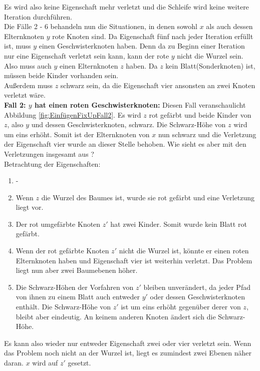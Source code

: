 \documentclass[a4paper,12pt]{article}
\begin{document}
\noindent Es wird also keine Eigenschaft mehr verletzt und die Schleife wird keine weitere Iteration durchführen.\\
Die Fälle 2 - 6 behandeln nun die Situationen, in denen sowohl $x$ als auch dessen Elternknoten $y$ rote Knoten sind. Da Eigenschaft fünf nach jeder Iteration erfüllt ist, muss $y$ einen Geschwisterknoten haben. Denn da zu Beginn einer Iteration nur eine Eigenschaft verletzt sein kann, kann der rote $y$ nicht die Wurzel sein. Also muss auch $y$ einen Elternknoten $z$ haben. Da $z$ kein Blatt(Sonderknoten) ist, müssen beide Kinder vorhanden sein.\\
Außerdem muss $z$ schwarz sein, da die Eigenschaft vier ansonsten an zwei Knoten verletzt wäre.\\

\noindent\textbf{Fall 2: $y$ hat einen roten Geschwisterknoten: } \label{if2}
\noindent Diesen Fall veranschaulicht Abbildung \ref{fig:EinfügenFixUpFall2}. Es wird $z$ rot gefärbt und beide Kinder von $z$, also $y$ und dessen Geschwisterknoten, schwarz. Die Schwarz-Höhe von $z$ wird um eins erhöht. Somit ist der Elternknoten von $x$ nun schwarz und die Verletzung der Eigenschaft vier wurde an dieser Stelle behoben. Wie sieht es aber mit den Verletzungen insgesamt aus ? \\

Betrachtung der Eigenschaften:

\begin{enumerate}
	\item -
	\item Wenn $z$ die Wurzel des Baumes ist, wurde sie rot gefärbt und eine Verletzung liegt vor.
	\item Der rot umgefärbte Knoten $z'$ hat zwei Kinder. Somit wurde kein Blatt rot gefärbt.
	\item  Wenn der rot gefärbte Knoten $z'$ nicht die Wurzel ist, könnte er einen roten Elternknoten haben und Eigenschaft vier ist weiterhin verletzt. Das Problem liegt nun aber zwei Baumebenen höher.
	\item  Die Schwarz-Höhen der Vorfahren von $z'$ bleiben unverändert, da jeder Pfad von ihnen zu einem Blatt auch entweder $y'$ oder dessen Geschwisterknoten enthält. Die Schwarz-Höhe von $z'$ ist um eins erhöht gegenüber derer von $z$, bleibt aber eindeutig. An keinem anderen Knoten ändert sich die Schwarz-Höhe. 
	
\end{enumerate} 
Es kann also wieder nur entweder Eigenschaft zwei oder vier verletzt sein. Wenn das Problem noch nicht an der Wurzel ist, liegt es zumindest zwei Ebenen näher daran. $x$ wird auf $z'$ gesetzt. 
\end{document}
